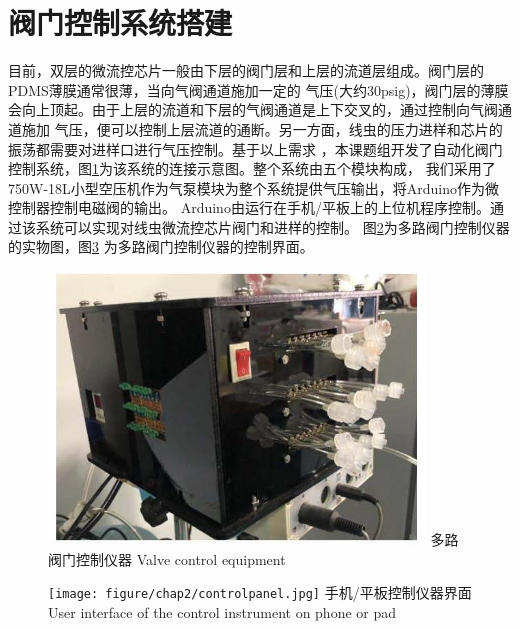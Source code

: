 	\begin{figure}[!htp]
    \centering
    \label{fig:flow_chart}
	\end{figure}
\section{阀门控制系统搭建}
	目前，双层的微流控芯片一般由下层的阀门层和上层的流道层组成。阀门层的PDMS薄膜通常很薄，当向气阀通道施加一定的
	气压(大约30psig)，阀门层的薄膜会向上顶起。由于上层的流道和下层的气阀通道是上下交叉的，通过控制向气阀通道施加
	气压，便可以控制上层流道的通断。另一方面，线虫的压力进样和芯片的振荡都需要对进样口进行气压控制。基于以上需求
	，本课题组开发了自动化阀门控制系统，图\ref{fig:flow_chart}为该系统的连接示意图。整个系统由五个模块构成，
	我们采用了750W-18L小型空压机作为气泵模块为整个系统提供气压输出，将Arduino作为微控制器控制电磁阀的输出。
	Arduino由运行在手机/平板上的上位机程序控制。通过该系统可以实现对线虫微流控芯片阀门和进样的控制。
	图\ref{fig:chap2:valve}为多路阀门控制仪器的实物图，图\ref{fig:chap2:controlpanel}
	为多路阀门控制仪器的控制界面。
	\begin{figure}[!ht]
	  \centering
	  \includegraphics[width=10cm]{figure/chap2/controlsys.jpg}
	  \bicaption
		{多路阀门控制仪器}%
		{Valve control equipment }
	  \label{fig:chap2:valve}
	\end{figure}
	\begin{figure}[!ht]
	  \centering
	  \texttt{[image: figure/chap2/controlpanel.jpg]}
	  \bicaption
		{手机/平板控制仪器界面}%
		{User interface of the control instrument on phone or pad }
	  \label{fig:chap2:controlpanel}
	\end{figure}
